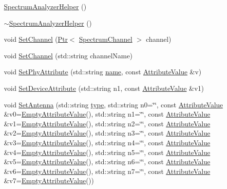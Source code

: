\begin{DoxyCompactItemize}
\item 
\hyperlink{classns3_1_1SpectrumAnalyzerHelper_aeb6e50773cbd2918c8100691339f8cd3}{Spectrum\+Analyzer\+Helper} ()
\item 
\hyperlink{classns3_1_1SpectrumAnalyzerHelper_ab4a41c6eb727598215c0921ae2c7f4e1}{$\sim$\+Spectrum\+Analyzer\+Helper} ()
\item 
void \hyperlink{classns3_1_1SpectrumAnalyzerHelper_a7fb7b79c0706c9aecd427af6c4148031}{Set\+Channel} (\hyperlink{classns3_1_1Ptr}{Ptr}$<$ \hyperlink{classns3_1_1SpectrumChannel}{Spectrum\+Channel} $>$ channel)
\item 
void \hyperlink{classns3_1_1SpectrumAnalyzerHelper_a49ac3589138aa54db1ee660561c31419}{Set\+Channel} (std\+::string channel\+Name)
\item 
void \hyperlink{classns3_1_1SpectrumAnalyzerHelper_a535a79dd9e2fb4293eb9e9e5fcb111ae}{Set\+Phy\+Attribute} (std\+::string \hyperlink{generate__test__data__lte__spectrum__model_8m_ab74e6bf80237ddc4109968cedc58c151}{name}, const \hyperlink{classns3_1_1AttributeValue}{Attribute\+Value} \&v)
\item 
void \hyperlink{classns3_1_1SpectrumAnalyzerHelper_a7c4d3de3d0e5ce307423f63840707e45}{Set\+Device\+Attribute} (std\+::string n1, const \hyperlink{classns3_1_1AttributeValue}{Attribute\+Value} \&v1)
\item 
void \hyperlink{classns3_1_1SpectrumAnalyzerHelper_aad80133b1bffa7aef619d098584cc83f}{Set\+Antenna} (std\+::string \hyperlink{visualizer-ideas_8txt_add98db9e15e2a58cf2b57623e7aa893a}{type}, std\+::string n0=\char`\"{}\char`\"{}, const \hyperlink{classns3_1_1AttributeValue}{Attribute\+Value} \&v0=\hyperlink{classns3_1_1EmptyAttributeValue}{Empty\+Attribute\+Value}(), std\+::string n1=\char`\"{}\char`\"{}, const \hyperlink{classns3_1_1AttributeValue}{Attribute\+Value} \&v1=\hyperlink{classns3_1_1EmptyAttributeValue}{Empty\+Attribute\+Value}(), std\+::string n2=\char`\"{}\char`\"{}, const \hyperlink{classns3_1_1AttributeValue}{Attribute\+Value} \&v2=\hyperlink{classns3_1_1EmptyAttributeValue}{Empty\+Attribute\+Value}(), std\+::string n3=\char`\"{}\char`\"{}, const \hyperlink{classns3_1_1AttributeValue}{Attribute\+Value} \&v3=\hyperlink{classns3_1_1EmptyAttributeValue}{Empty\+Attribute\+Value}(), std\+::string n4=\char`\"{}\char`\"{}, const \hyperlink{classns3_1_1AttributeValue}{Attribute\+Value} \&v4=\hyperlink{classns3_1_1EmptyAttributeValue}{Empty\+Attribute\+Value}(), std\+::string n5=\char`\"{}\char`\"{}, const \hyperlink{classns3_1_1AttributeValue}{Attribute\+Value} \&v5=\hyperlink{classns3_1_1EmptyAttributeValue}{Empty\+Attribute\+Value}(), std\+::string n6=\char`\"{}\char`\"{}, const \hyperlink{classns3_1_1AttributeValue}{Attribute\+Value} \&v6=\hyperlink{classns3_1_1EmptyAttributeValue}{Empty\+Attribute\+Value}(), std\+::string n7=\char`\"{}\char`\"{}, const \hyperlink{classns3_1_1AttributeValue}{Attribute\+Value} \&v7=\hyperlink{classns3_1_1EmptyAttributeValue}{Empty\+Attribute\+Value}())

\end{DoxyCompactItemize}
